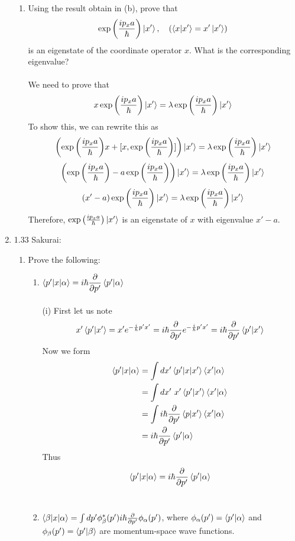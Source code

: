 \documentclass[11pt,letterpaper]{article}
\begin{document}
\begin{enumerate}
\begin{enumerate}
\item Using the result obtain in (b), prove that
$$\exp{\left(\frac{ip_xa}{\hbar}\right)}\ket{x^\prime}, \quad (\braket{x|x^\prime} = x^\prime\ket{x^\prime})$$
is an eigenstate of the coordinate operator $x$. What is the corresponding eigenvalue?
\\ \\We need to prove that 
$$x\exp{\left(\frac{ip_xa}{\hbar}\right)}\ket{x'} = \lambda \exp{\left(\frac{ip_xa}{\hbar}\right)}\ket{x'}$$
To show this, we can rewrite this as
$$\left(\exp{\left(\frac{ip_xa}{\hbar}\right)}x + [x,\exp{\left(\frac{ip_xa}{\hbar}\right)}]\right)\ket{x'} = \lambda \exp{\left(\frac{ip_xa}{\hbar}\right)}\ket{x'}$$
$$\left(\exp{\left(\frac{ip_xa}{\hbar}\right)}-a\exp{\left(\frac{ip_xa}{\hbar}\right)}\right)\ket{x'} = \lambda\exp{\left(\frac{ip_xa}{\hbar}\right)}\ket{x'}$$
$$(x'-a)\exp{\left(\frac{ip_xa}{\hbar}\right)}\ket{x'} = \lambda\exp{\left(\frac{ip_xa}{\hbar}\right)}\ket{x'}$$
Therefore, $\exp{\left(\frac{ip_xa}{\hbar}\right)}\ket{x'}$ is an eigenstate of $x$ with eigenvalue $x'- a$.
\end{enumerate}
\item 1.33 Sakurai: \begin{enumerate}
\item Prove the following: \begin{enumerate}
\item $\braket{p^\prime |x|\alpha} = i\hbar\dfrac{\partial}{\partial{p^\prime}}\braket{p^\prime|\alpha}$
\\ \\ (i) First let us note
$$x'\braket{p'|x'} = x' e^{-\frac{i}{\hbar}p'x'} = i\hbar\frac{\partial}{\partial p'}e^{-\frac{i}{\hbar}p'x'} = i\hbar\frac{\partial}{\partial p'}\braket{p'|x'}$$
Now we form 
\begin{align*}\braket{p'|x|\alpha}&=\int{dx'\braket{p'|x|x'}\braket{x'|\alpha}}\\
&=\int{dx'\ x'\braket{p'|x'}\braket{x'|\alpha}}\\
&=\int{i\hbar\frac{\partial}{\partial p'}\braket{p|x'}\braket{x'|\alpha}}\\
&=i\hbar\frac{\partial}{\partial p'}\braket{p'|\alpha}
\end{align*}
Thus
$$\braket{p'|x|\alpha}= i\hbar\frac{\partial}{\partial p'}\braket{p'|\alpha}$$
\\ \item $\braket{\beta|x|\alpha}=\int{dp^\prime\phi^*_\beta(p^\prime)i\hbar\frac{\partial}{\partial{p^\prime}}\phi_\alpha(p^\prime)}$, where $\phi_\alpha(p^\prime) = \braket{p^\prime|\alpha}$ and $\phi_\beta(p^\prime) = \braket{p^\prime|\beta}$ are momentum-space wave functions.

\end{enumerate}
\end{enumerate}
\end{enumerate}
\end{document}
